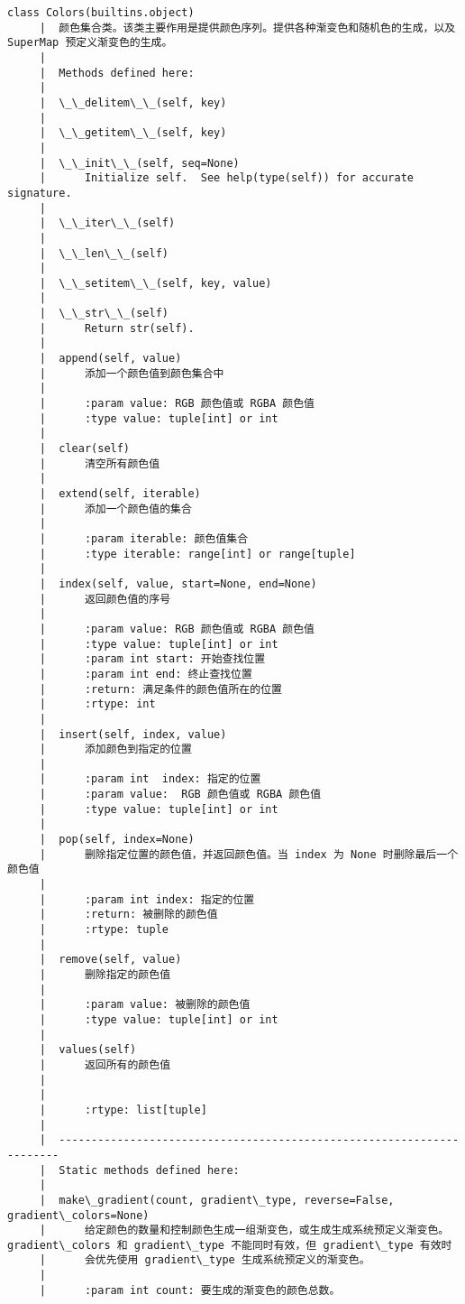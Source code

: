 \documentclass[11pt]{article}
\begin{document}
\begin{Verbatim}[commandchars=\\\{\}]
    class Colors(builtins.object)
     |  颜色集合类。该类主要作用是提供颜色序列。提供各种渐变色和随机色的生成，以及 SuperMap 预定义渐变色的生成。
     |  
     |  Methods defined here:
     |  
     |  \_\_delitem\_\_(self, key)
     |  
     |  \_\_getitem\_\_(self, key)
     |  
     |  \_\_init\_\_(self, seq=None)
     |      Initialize self.  See help(type(self)) for accurate signature.
     |  
     |  \_\_iter\_\_(self)
     |  
     |  \_\_len\_\_(self)
     |  
     |  \_\_setitem\_\_(self, key, value)
     |  
     |  \_\_str\_\_(self)
     |      Return str(self).
     |  
     |  append(self, value)
     |      添加一个颜色值到颜色集合中
     |      
     |      :param value: RGB 颜色值或 RGBA 颜色值
     |      :type value: tuple[int] or int
     |  
     |  clear(self)
     |      清空所有颜色值
     |  
     |  extend(self, iterable)
     |      添加一个颜色值的集合
     |      
     |      :param iterable: 颜色值集合
     |      :type iterable: range[int] or range[tuple]
     |  
     |  index(self, value, start=None, end=None)
     |      返回颜色值的序号
     |      
     |      :param value: RGB 颜色值或 RGBA 颜色值
     |      :type value: tuple[int] or int
     |      :param int start: 开始查找位置
     |      :param int end: 终止查找位置
     |      :return: 满足条件的颜色值所在的位置
     |      :rtype: int
     |  
     |  insert(self, index, value)
     |      添加颜色到指定的位置
     |      
     |      :param int  index: 指定的位置
     |      :param value:  RGB 颜色值或 RGBA 颜色值
     |      :type value: tuple[int] or int
     |  
     |  pop(self, index=None)
     |      删除指定位置的颜色值，并返回颜色值。当 index 为 None 时删除最后一个颜色值
     |      
     |      :param int index: 指定的位置
     |      :return: 被删除的颜色值
     |      :rtype: tuple
     |  
     |  remove(self, value)
     |      删除指定的颜色值
     |      
     |      :param value: 被删除的颜色值
     |      :type value: tuple[int] or int
     |  
     |  values(self)
     |      返回所有的颜色值
     |      
     |      
     |      :rtype: list[tuple]
     |  
     |  ----------------------------------------------------------------------
     |  Static methods defined here:
     |  
     |  make\_gradient(count, gradient\_type, reverse=False, gradient\_colors=None)
     |      给定颜色的数量和控制颜色生成一组渐变色，或生成生成系统预定义渐变色。gradient\_colors 和 gradient\_type 不能同时有效，但 gradient\_type 有效时
     |      会优先使用 gradient\_type 生成系统预定义的渐变色。
     |      
     |      :param int count: 要生成的渐变色的颜色总数。

\end{Verbatim}
\end{document}
